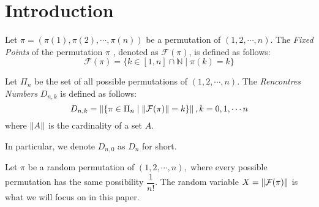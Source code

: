 
\section{Introduction}
Let $ \pi= (\pi(1), \pi(2),\cdots ,\pi(n))$ be a permutation of $ (1,2,\cdots ,n)$.
The \emph{Fixed Points} of the permutation $ \pi$ ,
denoted as $ \mathcal{F}(\pi)$, is defined as follows:
\[ \mathcal{F}(\pi) = \{ k \in [1,n]\cap \mathbb{N} \mid \pi(k) = k \}\]

Let $ \Pi_n$ be the set of all possible permutations of $ (1,2,\cdots ,n)$.
The \emph{Rencontres Numbers}\cite{wiki_rn}
$ D_{n,k}$ is defined as follows:
\[ D_{n,k} = \left\| \{ \pi \in \Pi_n \mid \left\|\mathcal{F}(\pi)\right\| = k \}\right\|, k = 0,1,\cdots n\]
where $ \left\|A\right\|$ is the cardinality of a set $ A$.

In particular, we denote $ D_{n,0}$ as $  D_{n} $ for short.

Let $ \pi $ be a random permutation of $ (1,2,\cdots ,n),$ where
every possible permutation has the same possibility $ \dfrac{1}{n!}$.
The random variable $ X = \left\|\mathcal{F}(\pi)\right\| $ is what we will focus on in this paper.

